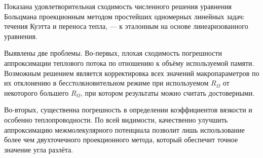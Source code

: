 Показана удовлетворительная сходимость численного решения уравнения Больцмана проекционным методом
простейших одномерных линейных задач: течения Куэтта и переноса тепла, --- к эталонным на основе
линеаризованного уравнения.

Выявлены две проблемы. Во-первых, плохая сходимость погрешности аппроксимации теплового потока по отношению к
объёму используемой памяти. Возможным решением является корректировка всех значений макропараметров
по их отклонению в бесстолкновительном режиме при используемом \(R_\Omega\) от некоторого большего \(R_\Omega\),
при котором результаты можно считать достоверными.

Во-вторых, существенна погрешность в определении коэффициентов вязкости и особенно теплопроводности.
По всей видимости, качественно улучшить аппроксимацию межмолекулярного потенциала позволит лишь использование
более чем двухточечного проекционного метода, который обеспечит точное значение угла разлёта.
